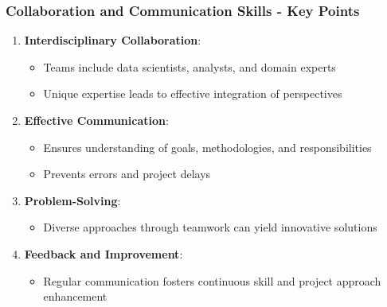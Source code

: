 \documentclass{beamer}
\begin{document}
\begin{frame}[fragile]
    \frametitle{Collaboration and Communication Skills - Key Points}
    \begin{enumerate}
        \item \textbf{Interdisciplinary Collaboration}:
        \begin{itemize}
            \item Teams include data scientists, analysts, and domain experts
            \item Unique expertise leads to effective integration of perspectives
        \end{itemize}
        
        \item \textbf{Effective Communication}:
        \begin{itemize}
            \item Ensures understanding of goals, methodologies, and responsibilities
            \item Prevents errors and project delays
        \end{itemize}
        
        \item \textbf{Problem-Solving}:
        \begin{itemize}
            \item Diverse approaches through teamwork can yield innovative solutions
        \end{itemize}
        
        \item \textbf{Feedback and Improvement}:
        \begin{itemize}
            \item Regular communication fosters continuous skill and project approach enhancement
        \end{itemize}
    \end{enumerate}
\end{frame}
\end{document}
